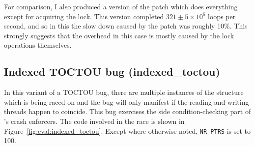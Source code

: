 
For comparison, I also produced a version of the patch which does
everything except for acquiring the lock.  This version completed $321
\pm 5 {\times} 10^6$ loops per second, and so in this the slow down
caused by the patch was roughly 10\%.  This strongly suggests that the
overhead in this case is mostly caused by the lock operations
themselves.



\subsection{Indexed TOCTOU bug (indexed\_toctou)}
\label{sect:eval:indexed_toctou}


In this variant of a TOCTOU bug, there are multiple instances of the
structure which is being raced on and the bug will only manifest if
the reading and writing threads happen to coincide.  This bug
exercises the side condition-checking part of {\technique}'s crash
enforcers.  The code involved in the race is shown in
Figure~\ref{fig:eval:indexed_toctou}.  Except where otherwise noted,
\verb|NR_PTRS| is set to 100.

